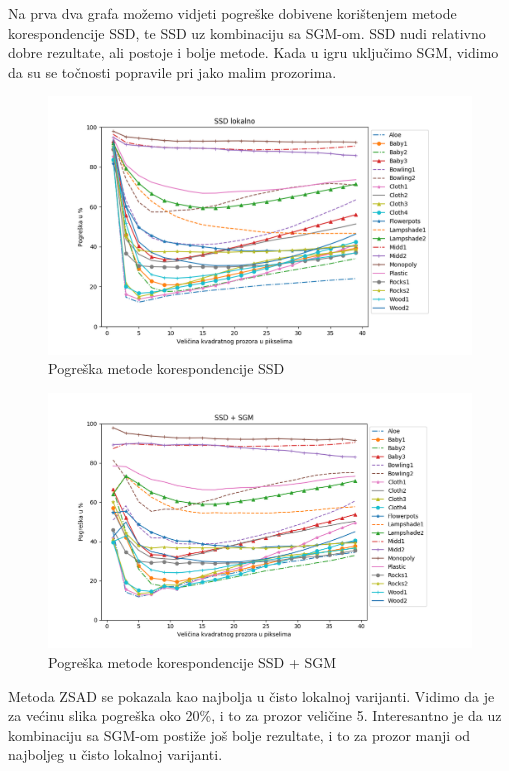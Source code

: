 \documentclass[utf8, zavrsni, numeric]{fer}
\begin{document}
Na prva dva grafa možemo vidjeti pogreške dobivene korištenjem metode korespondencije SSD, te
SSD uz kombinaciju sa SGM-om. SSD nudi relativno dobre rezultate, ali postoje i bolje
metode. Kada u igru uključimo SGM, vidimo da su se točnosti popravile pri jako malim
prozorima. 

\begin{figure}[H]
  \centering
  \includegraphics[width=13cm]{img/SSD_lokalno_middlebury.png}
  \caption{Pogreška metode korespondencije SSD}
  \label{fig:SSD-error}
\end{figure}

\begin{figure}[H]
  \centering
  \includegraphics[width=13cm]{img/SSD_sgm_middlebury.png}
  \caption{Pogreška metode korespondencije SSD + SGM}
  \label{fig:SSD-sgm-error}
\end{figure}

Metoda ZSAD se pokazala kao najbolja u čisto lokalnoj varijanti. Vidimo da je
za većinu slika pogreška oko 20\%, i to za prozor veličine 5. Interesantno je da
uz kombinaciju sa SGM-om postiže još bolje rezultate, i to za prozor manji od
najboljeg u čisto lokalnoj varijanti.
\end{document}
